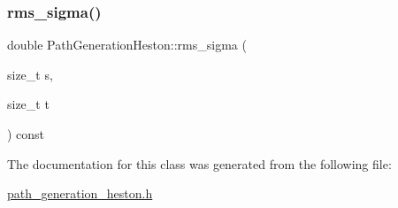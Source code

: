 \hypertarget{classPathGenerationHeston_a9dde14ddfe82fb957404c39998a0738b}{}\label{classPathGenerationHeston_a9dde14ddfe82fb957404c39998a0738b} 
\subsubsection{\texorpdfstring{rms\+\_\+sigma()}{rms\_sigma()}}
{\footnotesize\ttfamily double Path\+Generation\+Heston\+::rms\+\_\+sigma (\begin{DoxyParamCaption}\item[{size\+\_\+t}]{s,  }\item[{size\+\_\+t}]{t }\end{DoxyParamCaption}) const}



The documentation for this class was generated from the following file\+:\begin{DoxyCompactItemize}
\item 
\hyperlink{path__generation__heston_8h}{path\+\_\+generation\+\_\+heston.\+h}\end{DoxyCompactItemize}
